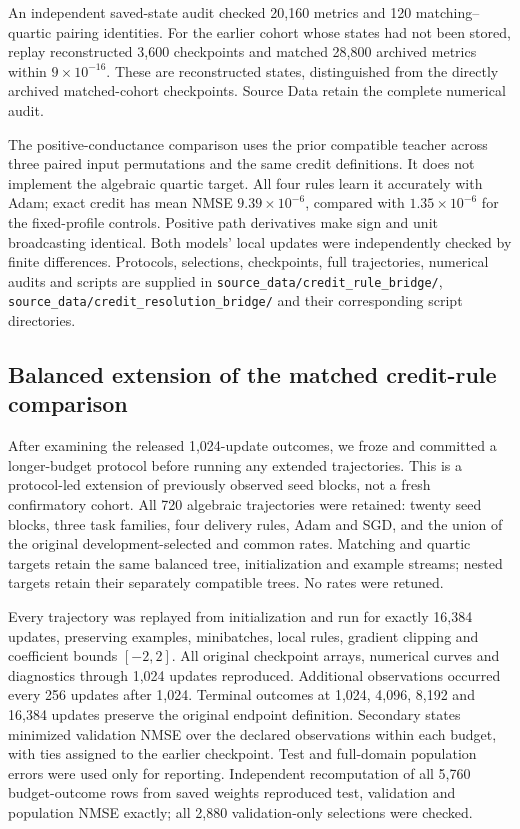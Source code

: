 An independent saved-state audit checked 20,160 metrics and 120 matching--quartic pairing identities. For the earlier cohort whose states had not been stored, replay reconstructed 3,600 checkpoints and matched 28,800 archived metrics within $9\times10^{-16}$. These are reconstructed states, distinguished from the directly archived matched-cohort checkpoints. Source Data retain the complete numerical audit.

The positive-conductance comparison uses the prior compatible teacher across three paired input permutations and the same credit definitions. It does not implement the algebraic quartic target. All four rules learn it accurately with Adam; exact credit has mean NMSE $9.39\times10^{-6}$, compared with $1.35\times10^{-6}$ for the fixed-profile controls. Positive path derivatives make sign and unit broadcasting identical. Both models' local updates were independently checked by finite differences. Protocols, selections, checkpoints, full trajectories, numerical audits and scripts are supplied in \texttt{source\_data/credit\_rule\_bridge/}, \texttt{source\_data/credit\_resolution\_bridge/} and their corresponding script directories.
\subsection{Balanced extension of the matched credit-rule comparison}
\label{sec:credit_rule_extension}

After examining the released 1,024-update outcomes, we froze and committed a longer-budget protocol before running any extended trajectories. This is a protocol-led extension of previously observed seed blocks, not a fresh confirmatory cohort. All 720 algebraic trajectories were retained: twenty seed blocks, three task families, four delivery rules, Adam and SGD, and the union of the original development-selected and common rates. Matching and quartic targets retain the same balanced tree, initialization and example streams; nested targets retain their separately compatible trees. No rates were retuned.

Every trajectory was replayed from initialization and run for exactly 16,384 updates, preserving examples, minibatches, local rules, gradient clipping and coefficient bounds $[-2,2]$. All original checkpoint arrays, numerical curves and diagnostics through 1,024 updates reproduced. Additional observations occurred every 256 updates after 1,024. Terminal outcomes at 1,024, 4,096, 8,192 and 16,384 updates preserve the original endpoint definition. Secondary states minimized validation NMSE over the declared observations within each budget, with ties assigned to the earlier checkpoint. Test and full-domain population errors were used only for reporting. Independent recomputation of all 5,760 budget-outcome rows from saved weights reproduced test, validation and population NMSE exactly; all 2,880 validation-only selections were checked.

